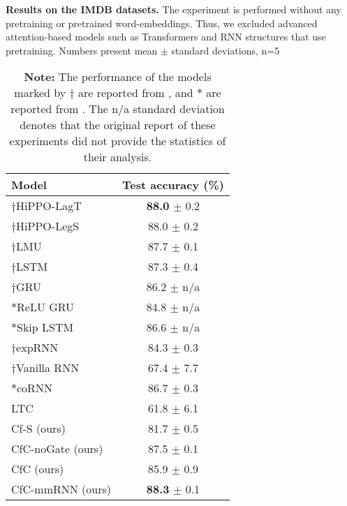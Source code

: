 \documentclass[12pt]{article}
\begin{document}
\begin{table}[t]
    \centering
    \caption{\textbf{Results on the IMDB datasets.} The experiment is performed without any pretraining or pretrained word-embeddings. Thus, we excluded advanced attention-based models \cite{shukla2021multi,ad-trans2021} such as Transformers \cite{vaswani2017attention} and RNN structures that use pretraining. Numbers present mean $\pm$ standard deviations, n=5}
    \begin{tabular}{lc}
    \toprule
         Model & Test accuracy (\%)  \\
    \midrule
          ${\dagger}$HiPPO-LagT \cite{gu2020hippo}  & \textbf{88.0} $\pm$ 0.2\\
           ${\dagger}$HiPPO-LegS \cite{gu2020hippo} & 88.0 $\pm$ 0.2\\
           ${\dagger}$LMU \cite{voelker2019legendre} & 87.7 $\pm$ 0.1\\
           ${\dagger}$LSTM \cite{hochreiter1997long}& 87.3 $\pm$ 0.4\\
           ${\dagger}$GRU \cite{chung2014empirical} & 86.2 $\pm$ n/a \\
          $\ast$ReLU GRU \cite{dey2017gate} &  84.8 $\pm$ n/a \\
          $\ast$Skip LSTM \cite{campos2017skip} &  86.6 $\pm$ n/a \\
           ${\dagger}$expRNN \cite{lezcano2019cheap} & 84.3 $\pm$ 0.3 \\
           ${\dagger}$Vanilla RNN \cite{campos2017skip} & 67.4 $\pm$ 7.7\\
          $\ast$coRNN \cite{rusch2021coupled} & 86.7 $\pm$ 0.3 \\
          LTC \cite{hasani2021liquid} & 61.8 $\pm$ 6.1 \\
    \midrule
        Cf-S (ours) & 81.7 $\pm$ 0.5\\
        CfC-noGate (ours) &  87.5 $\pm$ 0.1\\
        CfC (ours) & 85.9 $\pm$ 0.9\\
        CfC-mmRNN (ours) & \textbf{88.3} $\pm$ 0.1\\
    \bottomrule
    \end{tabular}
    \caption*{\textbf{Note:} The performance of the models marked by $\dagger$ are reported from \cite{gu2020hippo}, and $\ast$ are reported from \cite{rusch2021coupled}. The n/a standard deviation denotes that the original report of these experiments did not provide the statistics of their analysis.}
    \label{tab:imdb}
\end{table}
\end{document}
